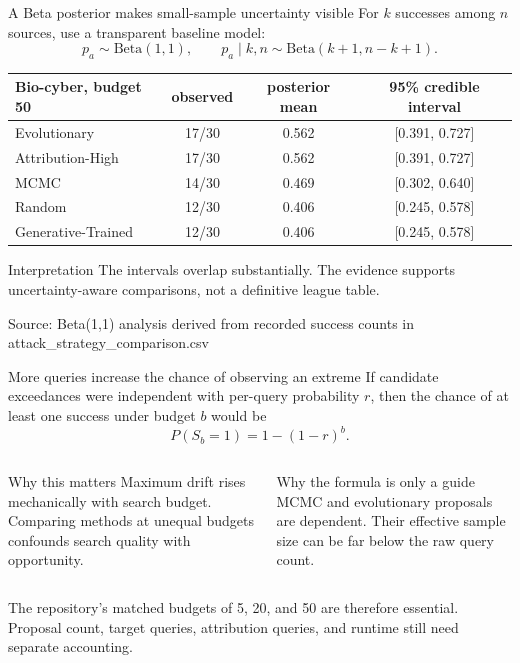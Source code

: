 \documentclass[aspectratio=169,10pt]{beamer}
\newcommand{\smallsource}[1]{\vfill{\tiny\color{Muted}Source: #1}}
\begin{document}
\begin{frame}{A Beta posterior makes small-sample uncertainty visible}
For $k$ successes among $n$ sources, use a transparent baseline model:
\[
p_a\sim\mathrm{Beta}(1,1),\qquad p_a\mid k,n\sim\mathrm{Beta}(k+1,n-k+1).
\]

\vspace{0.6em}
\begin{center}
\begin{tabular}{lccc}
\toprule
Bio-cyber, budget 50 & observed & posterior mean & 95\% credible interval\\
\midrule
Evolutionary & 17/30 & 0.562 & [0.391, 0.727]\\
Attribution-High & 17/30 & 0.562 & [0.391, 0.727]\\
MCMC & 14/30 & 0.469 & [0.302, 0.640]\\
Random & 12/30 & 0.406 & [0.245, 0.578]\\
Generative-Trained & 12/30 & 0.406 & [0.245, 0.578]\\
\bottomrule
\end{tabular}
\end{center}

\begin{block}{Interpretation}
The intervals overlap substantially. The evidence supports uncertainty-aware comparisons, not a definitive league table.
\end{block}
\smallsource{Beta(1,1) analysis derived from recorded success counts in attack\_strategy\_comparison.csv}
\end{frame}

\begin{frame}{More queries increase the chance of observing an extreme}
If candidate exceedances were independent with per-query probability $r$, then the chance of at least one success under budget $b$ would be
\[
P(S_b=1)=1-(1-r)^b.
\]

\begin{columns}[T,totalwidth=\textwidth]
\begin{block}{Why this matters}
Maximum drift rises mechanically with search budget. Comparing methods at unequal budgets confounds search quality with opportunity.
\end{block}
\begin{block}{Why the formula is only a guide}
MCMC and evolutionary proposals are dependent. Their effective sample size can be far below the raw query count.
\end{block}
\end{columns}

\vspace{0.8em}
The repository's matched budgets of 5, 20, and 50 are therefore essential. Proposal count, target queries, attribution queries, and runtime still need separate accounting.
\end{frame}
\end{document}
